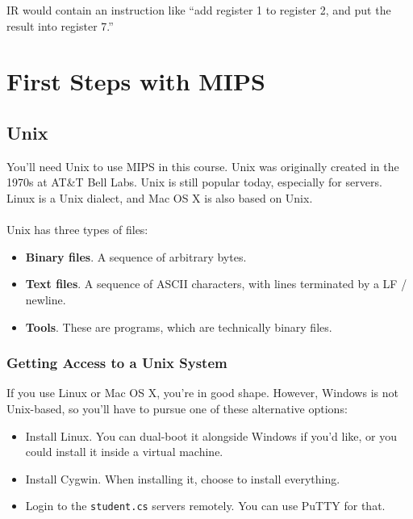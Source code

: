 \documentclass[]{article}
\theoremstyle{definition}
\newcommand{\lecture}[1]{\marginpar{{\footnotesize $\leftarrow$ \underline{#1}}}}
\begin{document}
				IR would contain an instruction like ``add register 1 to register 2, and put the result into register 7.''
	\section{First Steps with MIPS}
		\lecture{January 11, 2013}

		\subsection{Unix}
			You'll need Unix to use MIPS in this course. Unix was originally created in the 1970s at AT\&T Bell Labs. Unix is still popular today, especially for servers. Linux is a Unix dialect, and Mac OS X is also based on Unix. 
			\\ \\
			Unix has three types of files:
			\begin{itemize}
				\item \textbf{Binary files}. A sequence of arbitrary bytes.
				\item \textbf{Text files}. A sequence of ASCII characters, with lines terminated by a LF / newline.
				\item \textbf{Tools}. These are programs, which are technically binary files.
			\end{itemize}

			\subsubsection{Getting Access to a Unix System}
				If you use Linux or Mac OS X, you're in good shape. However, Windows is not Unix-based, so you'll have to pursue one of these alternative options:
				\begin{itemize}
				  	\item Install Linux. You can dual-boot it alongside Windows if you'd like, or you could install it inside a virtual machine.
				  	\item Install Cygwin. When installing it, choose to install everything.
					\item Login to the \verb+student.cs+ servers remotely. You can use PuTTY for that.
				\end{itemize}
\end{document}
